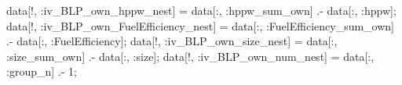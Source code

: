 \documentclass[
  letterpaper,
  DIV=11,
  numbers=noendperiod]{scrreprt}
\newenvironment{Shaded}{\begin{snugshade}}{\end{snugshade}}
\newcommand{\FloatTok}[1]{\textcolor[rgb]{0.68,0.00,0.00}{#1}}
\newcommand{\NormalTok}[1]{\textcolor[rgb]{0.00,0.23,0.31}{#1}}
\newcommand{\OperatorTok}[1]{\textcolor[rgb]{0.37,0.37,0.37}{#1}}
\begin{document}
\begin{Shaded}
\begin{Highlighting}[]
\NormalTok{data[!, }\OperatorTok{:}\NormalTok{iv\_BLP\_own\_hppw\_nest]             }\OperatorTok{=}\NormalTok{ data[}\OperatorTok{:}\NormalTok{, }\OperatorTok{:}\NormalTok{hppw\_sum\_own]           }\OperatorTok{.{-}}\NormalTok{ data[}\OperatorTok{:}\NormalTok{, }\OperatorTok{:}\NormalTok{hppw];}
\NormalTok{data[!, }\OperatorTok{:}\NormalTok{iv\_BLP\_own\_FuelEfficiency\_nest]   }\OperatorTok{=}\NormalTok{ data[}\OperatorTok{:}\NormalTok{, }\OperatorTok{:}\NormalTok{FuelEfficiency\_sum\_own] }\OperatorTok{.{-}}\NormalTok{ data[}\OperatorTok{:}\NormalTok{, }\OperatorTok{:}\NormalTok{FuelEfficiency];}
\NormalTok{data[!, }\OperatorTok{:}\NormalTok{iv\_BLP\_own\_size\_nest]             }\OperatorTok{=}\NormalTok{ data[}\OperatorTok{:}\NormalTok{, }\OperatorTok{:}\NormalTok{size\_sum\_own]           }\OperatorTok{.{-}}\NormalTok{ data[}\OperatorTok{:}\NormalTok{, }\OperatorTok{:}\NormalTok{size];}
\NormalTok{data[!, }\OperatorTok{:}\NormalTok{iv\_BLP\_own\_num\_nest]              }\OperatorTok{=}\NormalTok{ data[}\OperatorTok{:}\NormalTok{, }\OperatorTok{:}\NormalTok{group\_n]                }\OperatorTok{.{-}} \FloatTok{1}\NormalTok{;}


\end{Highlighting}
\end{Shaded}
\end{document}
